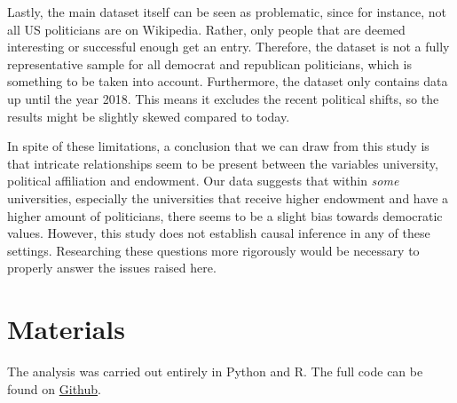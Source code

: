 \documentclass{article}
\begin{document}
Lastly, the main dataset itself can be seen as problematic, since for instance, not all US politicians are on Wikipedia. Rather, only people that are deemed interesting or successful enough get an entry. Therefore, the dataset is not a fully representative sample for all democrat and republican politicians, which is something to be taken into account. Furthermore, the dataset only contains data up until the year 2018.  This means it excludes the recent political shifts, so the results might be slightly skewed compared to today. 

In spite of these limitations, a conclusion that we can draw from this study is that intricate relationships seem to be present between the variables university, political affiliation and endowment. Our data suggests that within \textit{some} universities, especially the universities that receive higher endowment and have a higher amount of politicians, there seems to be a slight bias towards democratic values. However, this study does not establish causal inference in any of these settings. Researching these questions more rigorously would be necessary to properly answer the issues raised here.

\section{Materials}
\label{sec:materials}
The analysis was carried out entirely in Python and R. The full code can be found on \href{https://github.com/imargit/cracked.egg}{Github}.

\printbibliography
\end{document}
